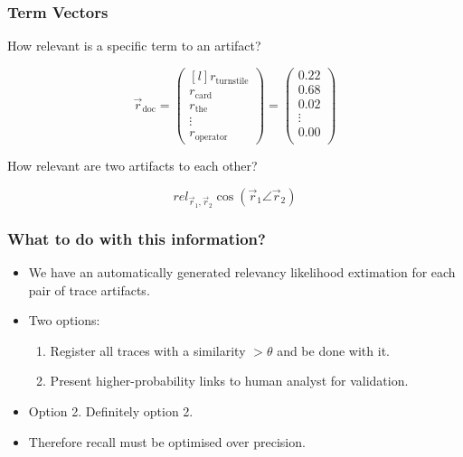 \documentclass{beamer}
\begin{document}
\begin{frame}
\frametitle{Term Vectors}
How relevant is a specific term to an artifact?

\[\vec{r}_\text{doc}=
\begin{pmatrix*}[l]
  r_\text{turnstile}\\
  r_\text{card}\\
  r_\text{the}\\
  \vdots\\
  r_\text{operator}
\end{pmatrix*}
=
\begin{pmatrix}
  0.22\\
  0.68\\
  0.02\\
  \vdots\\
  0.00\\
\end{pmatrix}
\]

\vfill
How relevant are two artifacts to each other?

\[ rel_{\vec r_1, \vec r_2} \cos(\vec r_1 \angle \vec r_2) \]

\end{frame}

\begin{frame}
\frametitle{What to do with this information?}
\begin{itemize}
\item We have an automatically generated relevancy likelihood extimation for each pair of trace artifacts.
\item Two options:
  \begin{enumerate}
  \item Register all traces with a similarity $>\theta$ and be done with it.
  \item Present higher-probability links to human analyst for validation.
  \end{enumerate}
\item Option 2. Definitely option 2.
\item Therefore recall must be optimised over precision.
\end{itemize}
\end{frame}
\end{document}

